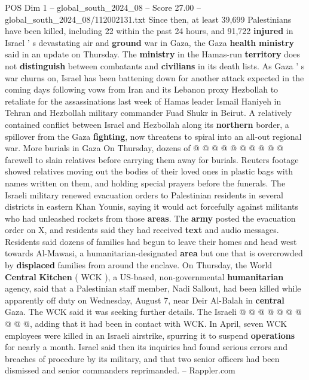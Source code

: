 \begin{textsample}{POS Dim 1 – global\_south\_2024\_08 – Score 27.00 – global\_south\_2024\_08/112002131.txt}
Since then, at least 39,699 Palestinians have been killed, including 22 within the past 24 hours, and 91,722 \textbf{injured} in Israel ' s devastating air and \textbf{ground} war in Gaza, the Gaza \textbf{health} \textbf{ministry} said in an update on Thursday.
The \textbf{ministry} in the Hamas-run \textbf{territory} does not \textbf{distinguish} between combatants and \textbf{civilians} in its death lists.
As Gaza ' s war churns on, Israel has been battening down for another attack expected in the coming days following vows from Iran and its Lebanon proxy Hezbollah to retaliate for the assassinations last week of Hamas leader Ismail Haniyeh in Tehran and Hezbollah military commander Fuad Shukr in Beirut.
A relatively contained conflict between Israel and Hezbollah along its \textbf{northern} border, a spillover from the Gaza \textbf{fighting}, now threatens to spiral into an all-out regional war.
More burials in Gaza On Thursday, dozens of @ @ @ @ @ @ @ @ @ @ farewell to slain relatives before carrying them away for burials.
Reuters footage showed relatives moving out the bodies of their loved ones in plastic bags with names written on them, and holding special prayers before the funerals.
The Israeli military renewed evacuation orders to Palestinian residents in several districts in eastern Khan Younis, saying it would act forcefully against militants who had unleashed rockets from those \textbf{areas}.
The \textbf{army} posted the evacuation order on X, and residents said they had received \textbf{text} and audio messages.
Residents said dozens of families had begun to leave their homes and head west towards Al-Mawasi, a humanitarian-designated \textbf{area} but one that is overcrowded by \textbf{displaced} families from around the enclave.
On Thursday, the World \textbf{Central} \textbf{Kitchen} ( WCK ), a US-based, non-governmental \textbf{humanitarian} agency, said that a Palestinian staff member, Nadi Sallout, had been killed while apparently off duty on Wednesday, August 7, near Deir Al-Balah in \textbf{central} Gaza.
The WCK said it was seeking further details.
The Israeli @ @ @ @ @ @ @ @ @ @, adding that it had been in contact with WCK.
In April, seven WCK employees were killed in an Israeli airstrike, spurring it to suspend \textbf{operations} for nearly a month.
Israel said then its inquiries had found serious errors and breaches of procedure by its military, and that two senior officers had been dismissed and senior commanders reprimanded. -- Rappler.com

\end{textsample}
